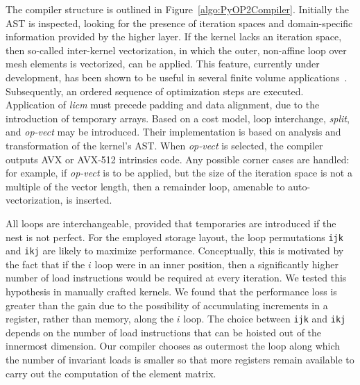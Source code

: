 \documentclass[conference]{IEEEtran}
\begin{document}
The compiler structure is outlined in Figure~\ref{algo:PyOP2Compiler}. Initially the AST is inspected, looking for the presence of iteration spaces and domain-specific information provided by the higher layer. If the kernel lacks an iteration space, then so-called inter-kernel vectorization, in which the outer, non-affine loop over mesh elements is vectorized, can be applied. This feature, currently under development, has been shown to be useful in several finite volume applications~\cite{inter-kernel-vect}. Subsequently, an ordered sequence of optimization steps are executed. Application of \emph{licm} must precede padding and data alignment, due to the introduction of temporary arrays. Based on a cost model, loop interchange, \emph{split}, and \emph{op-vect} may be introduced. Their implementation is based on analysis and transformation of the kernel's AST. When \emph{op-vect} is selected, the compiler outputs AVX or AVX-512 intrinsics code. Any possible corner cases are handled: for example, if \emph{op-vect} is to be applied, but the size of the iteration space is not a multiple of the vector length, then a remainder loop, amenable to auto-vectorization, is inserted.

All loops are interchangeable, provided that temporaries are introduced if the nest is not perfect. For the employed storage layout, the loop permutations \texttt{ijk} and \texttt{ikj} are likely to maximize performance. Conceptually, this is motivated by the fact that if the $i$ loop were in an inner position, then a significantly higher number of load instructions would be required at every iteration. We tested this hypothesis in manually crafted kernels. We found that the performance loss is greater than the gain due to the possibility of accumulating increments in a register, rather than memory, along the $i$ loop. The choice between \texttt{ijk} and \texttt{ikj} depends on the number of load instructions that can be hoisted out of the innermost dimension. Our compiler chooses as outermost the loop along which the number of invariant loads is smaller so that more registers remain available to carry out the computation of the element matrix.
\end{document}
